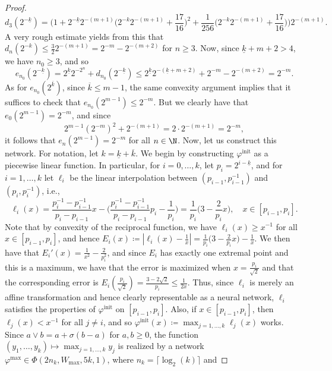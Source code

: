 \documentclass[a4paper, 11pt, headings = small, abstract]{scrartcl}
\begin{document}
\begin{proof}
    \[
     	d_3(2^{-\underline{k}})
     	=\Big(1+2^{-\underline{k}}2^{-(m+1)}\Big(2^{-k}2^{-(m+1)}+\frac{17}{16}\Big)^2+\frac{1}{256}\Big(2^{-k}2^{-(m+1)}+\frac{17}{16}\Big)\Big)2^{-(m+1)}.
    \]
    A very rough estimate yields from this that $d_n(2^{-k})\le\frac{3}{2}2^{-(m+1)}=2^{-m}-2^{-(m+2)}$ for $n\ge3$.
	Now, since $\underline{k}+m+2>4$, we have $n_0\ge 3$, and so
    \[
        e_{n_0}(2^{-\underline{k}})
        =2^{\underline{k}}2^{-2^n}+d_{n_0}(2^{-\underline{k}})
        \le2^{\underline{k}}2^{-(\underline{k}+m+2)}+2^{-m}-2^{-(m+2)}
        =2^{-m}.
    \]
    As for $e_{n_0}(2^{\overline{k}})$, since $\overline{k}\le m-1$, the same convexity argument implies that it suffices to check that $e_{n_0}(2^{m-1})\le 2^{-m}$.
    But we clearly have that $e_0(2^{m-1})=2^{-m}$, and since
    \[
        2^{m-1}(2^{-m})^2+2^{-(m+1)}
        =2\cdot 2^{-(m+1)}
        =2^{-m},
    \]
    it follows that $e_n(2^{m-1})=2^{-m}$ for all $n\in\N$.
    Now, let us construct this network.
    For notation, let $k=\underline{k}+\overline{k}$.
    We begin by constructing $\varphi^{\mathrm{init}}$ as a piecewise linear function.
    In particular, for $i=0,\ldots,k$, let $p_i=2^{i-\underline{k}}$, and for $i=1,\ldots,k$ let $\ell_i$ be the linear interpolation between $(p_{i-1}, p_{i-1}^{-1})$ and $(p_i, p_i^{-1})$, i.e.,
    \[
        \ell_i(x)
        =\frac{p_i^{-1}-p_{i-1}^{-1}}{p_i-p_{i-1}}x-\Big(\frac{p_i^{-1}-p_{i-1}^{-1}}{p_i-p_{i-1}}p_i-\frac{1}{p_i}\Big)
        =\frac{1}{p_i}\big(3-\frac{2}{p_i}x\big),\quad x\in[p_{i-1}, p_i].
    \]
    Note that by convexity of the reciprocal function, we have $\ell_i(x)\ge x^{-1}$ for all $x\in[p_{i-1}, p_i]$, and hence $E_i(x)\coloneqq|\ell_i(x)-\frac{1}{x}|=\frac{1}{p_i}\big(3-\frac{2}{p_i}x\big)-\frac{1}{x}$.
    We then have that $E_i'(x)=\frac{1}{x^2}-\frac{2}{p_i^2}$, and since $E_i$ has exactly one extremal point and this is a maximum, we have that the error is maximized when $x=\frac{p_i}{\sqrt{2}}$ and that the corresponding error is $E_i(\frac{p_i}{\sqrt{2}})=\frac{3-2\sqrt{2}}{p_i}\le\frac{1}{2x}$.
    Thus, since $\ell_i$ is merely an affine transformation and hence clearly representable as a neural network, $\ell_i$ satisfies the properties of $\varphi^{\mathrm{init}}$ on $[p_{i-1}, p_i]$.
    Also, if $x\in[p_{i-1}, p_i]$, then $\ell_j(x)<x^{-1}$ for all $j\neq i$, and so $\varphi^{\mathrm{init}}(x)\coloneqq\max_{j=1,\ldots,k}\ell_j(x)$ works.
    Since $a\vee b=a+\sigma(b-a)$ for $a, b\ge0$, the function $(y_1, \ldots, y_{k})\mapsto\max_{j=1,\ldots,k}y_j$ is realized by a network $\varphi^{\max}\in\Phi(2n_{k}, W_{\max}, 5k, 1)$, where $n_{k}=\lceil\log_2(k)\rceil$ and

\end{proof}
\end{document}
